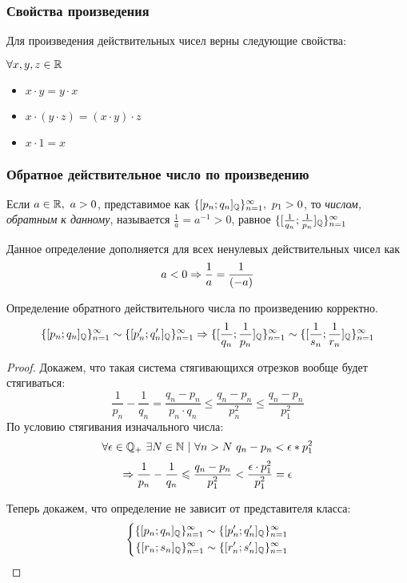 \subsubsection*{Свойства произведения}

Для произведения действительных чисел верны следующие свойства:

$\forall x, y, z \in \mathbb{R}$
\begin{itemize}
    \item $x \cdot y = y \cdot x$
    \item $x \cdot (y \cdot z) = (x \cdot y) \cdot z$
    \item $x \cdot 1 = x$
\end{itemize}

\subsubsection*{Обратное действительное число по произведению}

\begin{definition}
    Если $a \in \mathbb{R},\ a > 0$, представимое как $\{[p_n; q_n]_{\mathbb{Q}}\}_{n = 1}^\infty,\ p_1 > 0$, то \textit{числом, обратным к данному}, называется $\frac{1}{a} = a^{-1} > 0$, равное $\{[\frac{1}{q_n};\frac{1}{p_n}]_{\mathbb{Q}}\}_{n = 1}^\infty$
\end{definition}

Данное определение дополняется для всех ненулевых действительных чисел как
$$
    a < 0 \Rightarrow \frac{1}{a} = \frac{1}{(-a)}
$$

\begin{proposition}
    Определение обратного действительного числа по произведению корректно.
    $$
        \{[p_n; q_n]_{\mathbb{Q}}\}_{n = 1}^\infty \sim \{[p'_n; q'_n]_{\mathbb{Q}}\}_{n = 1}^\infty \Rightarrow \{[\frac{1}{q_n}; \frac{1}{p_n}]_{\mathbb{Q}}\}_{n = 1}^\infty \sim \{[\frac{1}{s_n}; \frac{1}{r_n}]_{\mathbb{Q}}\}_{n = 1}^\infty
    $$
\end{proposition}

\begin{proof}
    Докажем, что такая система стягивающихся отрезков вообще будет стягиваться:
    $$
        \frac{1}{p_n} - \frac{1}{q_n} = \frac{q_n - p_n}{p_n \cdot q_n} \le \frac{q_n - p_n}{p^2_n} \le \frac{q_n - p_n}{p^2_1}
    $$
    По условию стягивания изначального числа:
    $$
        \forall \veps \in \Q_+\ \exists N \in \N\ |\ \forall n > N\ q_n - p_n < \veps * p^2_1
    $$
    $$
        \Rightarrow \frac{1}{p_n} - \frac{1}{q_n} \leqslant \frac{q_n - p_n}{p^2_1} < \frac{\epsilon \cdot p^2_1}{p^2_1} = \epsilon
    $$
    
    Теперь докажем, что определение не зависит от представителя класса:
    $$
        \left\{\begin{aligned}\{[p_n; q_n]_{\mathbb{Q}}\}_{n = 1}^\infty \sim \{[p'_n; q'_n]_{\mathbb{Q}}\}_{n = 1}^\infty \\ 
            \{[r_n; s_n]_{\mathbb{Q}}\}_{n = 1}^\infty \sim \{[r'_n; s'_n]_{\mathbb{Q}}\}_{n = 1}^\infty\end{aligned}\right.
    $$
\end{proof}
